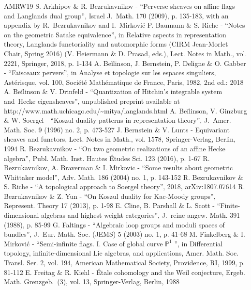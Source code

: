 \documentclass[10pt,a4paper]{amsart}
\theoremstyle{remark}
\numberwithin{equation}{section}
\begin{document}
\begin{thebibliography}{AMRW19}
 S. Arkhipov \& R. Bezrukavnikov - “Perverse sheaves on affine flags and Langlands dual group”, Israel J. Math. 170 (2009), p. 135-183, with an appendix by R. Bezrukavnikov and I. Mirković
 P. Baumann \& S. Riche - “Notes on the geometric Satake equivalence”, in Relative aspects in representation theory, Langlands functoriality and automorphic forms (CIRM Jean-Morlet Chair, Spring 2016) (V. Heiermann \& D. Prasad, eds.), Lect. Notes in Math., vol. 2221, Springer, 2018, p. 1-134
 A. Beĭlinson, J. Bernstein, P. Deligne \& O. Gabber - “Faisceaux pervers”, in Analyse et topologie sur les espaces singuliers, Astérisque, vol. 100, Société Mathématique de France, Paris, 1982, 2nd ed.: 2018
 A. Beĭlinson \& V. Drinfeld - “Quantization of Hitchin’s integrable system and Hecke eigensheaves”, unpublished preprint available at http://www.math.uchicago.edu/\textasciitilde{}mitya/langlands.html
 A. Beĭlinson, V. Ginzburg \& W. Soergel - “Koszul duality patterns in representation theory”, J. Amer. Math. Soc. 9 (1996) no. 2, p. 473-527
 J. Bernstein \& V. Lunts - Equivariant sheaves and functors, Lect. Notes in Math., vol. 1578, Springer-Verlag, Berlin, 1994
 R. Bezrukavnikov - “On two geometric realizations of an affine Hecke algebra”, Publ. Math. Inst. Hautes Études Sci. 123 (2016), p. 1-67
 R. Bezrukavnikov, A. Braverman \& I. Mirkovic - “Some results about geometric Whittaker model”, Adv. Math. 186 (2004) no. 1, p. 143-152
 R. Bezrukavnikov \& S. Riche - “A topological approach to Soergel theory”, 2018, arXiv:1807.07614
 R. Bezrukavnikov \& Z. Yun - “On Koszul duality for Kac-Moody groups”, Represent. Theory 17 (2013), p. 1-98
 E. Cline, B. Parshall \& L. Scott - “Finite-dimensional algebras and highest weight categories”, J. reine angew. Math. 391 (1988), p. 85-99
 G. Faltings - “Algebraic loop groups and moduli spaces of bundles”, J. Eur. Math. Soc. (JEMS) 5 (2003) no. 1, p. 41-68
 M. Finkelberg \& I. Mirković - “Semi-infinite flags. I. Case of global curve $\mathbb{P}^1$ ”, in Differential topology, infinite-dimensional Lie algebras, and applications, Amer. Math. Soc. Transl. Ser. 2, vol. 194, American Mathematical Society, Providence, RI, 1999, p. 81-112
 E. Freitag \& R. Kiehl - Étale cohomology and the Weil conjecture, Ergeb. Math. Grenzgeb. (3), vol. 13, Springer-Verlag, Berlin, 1988

\end{thebibliography}
\end{document}
